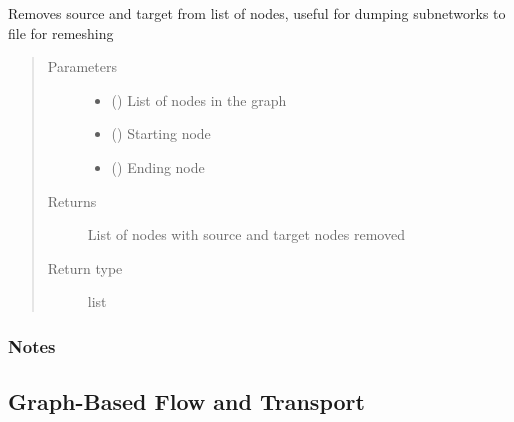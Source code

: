 \documentclass[letterpaper,10pt,english]{sphinxmanual}
\begin{document}
\begin{fulllineitems}
\label{\detokenize{pydfnworks:pydfnworks.dfnGraph.dfn2graph.pull_source_and_target}}
Removes source and target from list of nodes, useful for dumping subnetworks to file for remeshing
\begin{quote}\begin{description}
\item[{Parameters}] \leavevmode\begin{itemize}
\item {} 
 () \textendash{} List of nodes in the graph

\item {} 
 () \textendash{} Starting node

\item {} 
 () \textendash{} Ending node

\end{itemize}

\item[{Returns}] \leavevmode
{} \textendash{} List of nodes with source and target nodes removed

\item[{Return type}] \leavevmode
list

\end{description}\end{quote}
\subsubsection*{Notes}

\end{fulllineitems}



\subsection{Graph-Based Flow and Transport}
\label{\detokenize{pydfnworks:module-pydfnworks.dfnGraph.graph_flow}}\label{\detokenize{pydfnworks:graph-based-flow-and-transport}}
\end{document}
